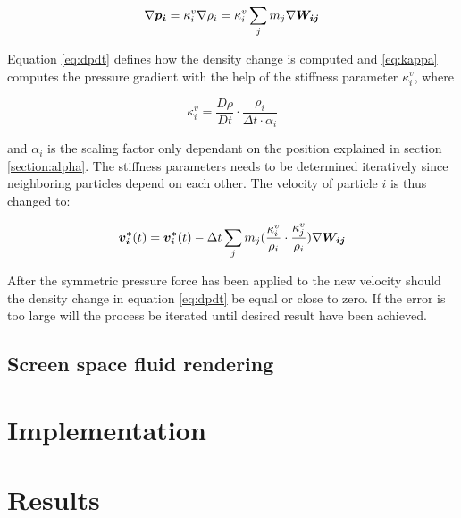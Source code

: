\begin{equation} \label{eq:kappa}
\nabla \bm{p_i} = \kappa_i^v \nabla \rho_i = \kappa_i^v \sum_j m_j \nabla \bm{W_{ij}}
\end{equation}

Equation \ref{eq:dpdt} defines how the density change is computed and \ref{eq:kappa} computes the pressure gradient with the help of the stiffness parameter $\kappa_i^v$, where 

\begin{equation}
\kappa_i^v = \frac{D\rho}{Dt} \cdot \frac{\rho_i}{\Delta t \cdot \alpha_i}
\end{equation}

and $\alpha_i$ is the scaling factor only dependant on the position explained in section \ref{section:alpha}. The stiffness parameters needs to be determined iteratively since neighboring particles depend on each other.
The velocity of particle $i$ is thus changed to:

\begin{equation} \label{eq:pressuretotal}
\bm{v_i^*}(t) = \bm{v_i^*}(t) - \Delta t \sum_j m_j (\frac{\kappa_i^v}{\rho_i} \cdot \frac{\kappa_j^v}{\rho_i}) \nabla \bm{W_{ij}}
\end{equation}

After the symmetric pressure force has been applied to the new velocity should the density change in equation \ref{eq:dpdt} be equal or close to zero. If the error is too large will the process be iterated until desired result have been achieved.


\subsection{Screen space fluid rendering}

\section{Implementation}
 

\section{Results}



